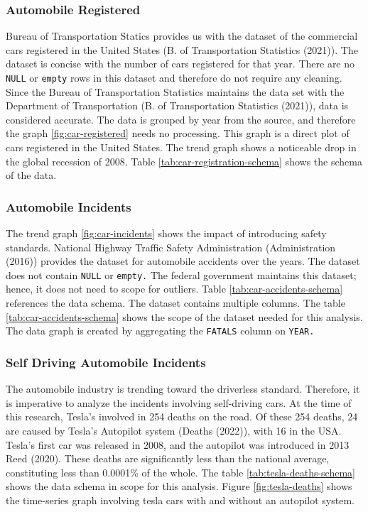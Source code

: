 \documentclass[
  man,floatsintext]{apa7}
\begin{document}
\hypertarget{automobile-registered}{%
\subsubsection{Automobile Registered}\label{automobile-registered}}

Bureau of Transportation Statics provides us with the dataset of the commercial cars registered in the United States (B. of Transportation Statistics (2021)). The dataset is concise with the number of cars registered for that year. There are no \texttt{NULL} or \texttt{empty} rows in this dataset and therefore do not require any cleaning. Since the Bureau of Transportation Statistics maintains the data set with the Department of Transportation (B. of Transportation Statistics (2021)), data is considered accurate. The data is grouped by year from the source, and therefore the graph \ref{fig:car-registered} needs no processing. This graph is a direct plot of cars registered in the United States. The trend graph shows a noticeable drop in the global recession of 2008. Table \ref{tab:car-registration-schema} shows the schema of the data.\\

\hypertarget{automobile-incidents}{%
\subsubsection{Automobile Incidents}\label{automobile-incidents}}

The trend graph \ref{fig:car-incidents} shows the impact of introducing safety standards. National Highway Traffic Safety Administration (Administration (2016)) provides the dataset for automobile accidents over the years. The dataset does not contain \texttt{NULL} or \texttt{empty.} The federal government maintains this dataset; hence, it does not need to scope for outliers. Table \ref{tab:car-accidents-schema} references the data schema. The dataset contains multiple columns. The table \ref{tab:car-accidents-schema} shows the scope of the dataset needed for this analysis. The data graph is created by aggregating the \texttt{FATALS} column on \texttt{YEAR.}

\hypertarget{self-driving-automobile-incidents}{%
\subsubsection{Self Driving Automobile Incidents}\label{self-driving-automobile-incidents}}

The automobile industry is trending toward the driverless standard. Therefore, it is imperative to analyze the incidents involving self-driving cars. At the time of this research, Tesla's involved in 254 deaths on the road. Of these 254 deaths, 24 are caused by Tesla's Autopilot system (Deaths (2022)), with 16 in the USA. Tesla's first car was released in 2008, and the autopilot was introduced in 2013 Reed (2020). These deaths are significantly less than the national average, constituting less than 0.0001\% of the whole. The table \ref{tab:tesla-deaths-schema} shows the data schema in scope for this analysis. Figure \ref{fig:tesla-deaths} shows the time-series graph involving tesla cars with and without an autopilot system.
\end{document}

